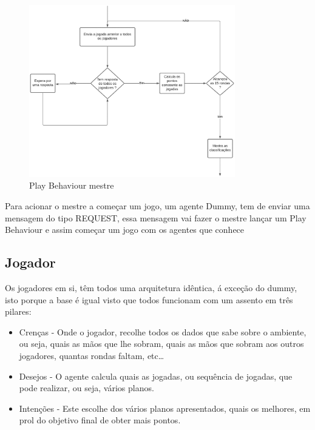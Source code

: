 \documentclass[12pt]{article}
\begin{document}
	\begin{figure}[h]
		\centering
        \includegraphics[width=0.80\textwidth]{mestrealg.eps}
		\caption{Play Behaviour mestre}
		\label{fig:mestrealg}
	\end{figure}
	

    Para acionar o mestre a começar um jogo, um agente Dummy, tem de enviar uma mensagem do tipo REQUEST, essa mensagem vai fazer o mestre lançar um Play Behaviour e assim começar um jogo com os agentes que conhece\\
	
	\subsection*{Jogador}
	Os jogadores em si, têm todos uma arquitetura idêntica, á exceção do dummy, isto porque a base é igual visto que todos funcionam com um assento em três pilares:\\
	
	
	\begin{itemize}
        \item Crenças - Onde o jogador, recolhe todos os dados que sabe sobre o ambiente, ou seja, quais as mãos que lhe sobram, quais as mãos que sobram aos outros jogadores, quantas rondas faltam, etc…
        
        \item Desejos - O agente calcula quais as jogadas, ou sequência de jogadas, que pode realizar, ou seja, vários planos.
        
        \item Intenções - Este escolhe dos vários planos apresentados, quais os melhores, em prol do objetivo final de obter mais pontos.
    \end{itemize}
\end{document}
